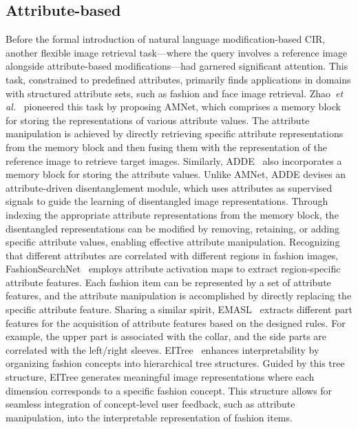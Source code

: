 \subsection{Attribute-based}
Before the formal introduction of natural language modification-based CIR, another flexible image retrieval task—where the query involves a reference image alongside attribute-based modifications—had garnered significant attention. This task, constrained to predefined attributes, primarily finds applications in domains with structured attribute sets, such as fashion and face image retrieval.
Zhao~\textit{et al.}~\cite{amnet} pioneered this task by proposing AMNet, which comprises a memory block for storing the representations of various attribute values. The attribute manipulation is achieved by directly retrieving specific attribute representations from the memory block and then fusing them with the representation of the reference image to retrieve target images. Similarly, ADDE~\cite{adde} also incorporates a memory block for storing the attribute values. Unlike AMNet, ADDE devises an attribute-driven disentanglement module, which uses attributes as supervised signals to guide the learning of disentangled image representations. Through indexing the appropriate attribute representations from the memory block, the disentangled representations can be modified by removing, retaining, or adding specific attribute values, enabling effective attribute manipulation. Recognizing that different attributes are correlated with different regions in fashion images, FashionSearchNet~\cite{FashionSearchNet} employs attribute activation maps to extract region-specific attribute features. Each fashion item can be represented by a set of attribute features, and the attribute manipulation is accomplished by directly replacing the specific attribute feature. Sharing a similar spirit, EMASL~\cite{EMASL} extracts different part features for the acquisition of attribute features based on the designed rules. For example, the upper part is associated with the collar, and the side parts are correlated with the left/right sleeves. %
EITree~\cite{eitree} enhances interpretability by organizing fashion concepts into hierarchical tree structures. Guided by this tree structure, EITree generates meaningful image representations where each dimension corresponds to a specific fashion concept. This structure allows for seamless integration of concept-level user feedback, such as attribute manipulation, into the interpretable representation of fashion items.
